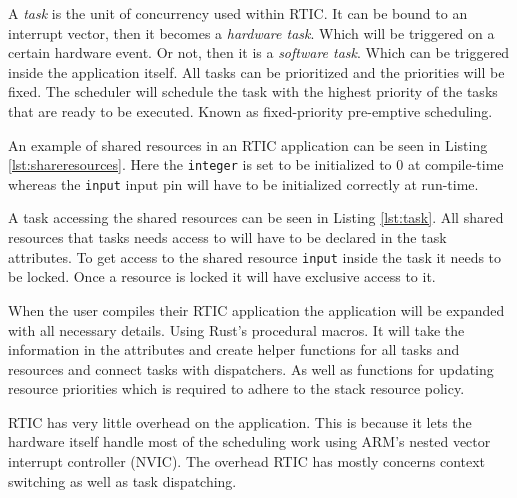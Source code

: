 A \emph{task} is the unit of concurrency used within RTIC. It can be bound to
an interrupt vector, then it becomes a \emph{hardware task}. Which will be
triggered on a certain hardware event. Or not, then it is a \emph{software
task}. Which can be triggered inside the application itself. All tasks can be
prioritized and the priorities will be fixed. The scheduler will schedule
the task with the highest priority of the tasks that are ready to be executed.
Known as fixed-priority pre-emptive scheduling\cite{fixedpriorityhistory}.

An example of shared resources in an RTIC application can be seen in Listing
\ref{lst:shareresources}. Here the \texttt{integer} is set to be initialized to
$0$ at compile-time whereas the \texttt{input} input pin will have to be initialized
correctly at run-time.


A task accessing the shared resources can be seen in Listing \ref{lst:task}.
All shared resources that tasks needs access to will have to be declared in the
task attributes. To get access to the shared resource \texttt{input} inside the
task it needs to be locked. Once a resource is locked it will have exclusive
access to it.


When the user compiles their RTIC application the application will be expanded
with all necessary details. Using Rust's procedural macros. It will take the
information in the attributes and create helper functions for all tasks and
resources and connect tasks with dispatchers. As well as functions for updating
resource priorities which is required to adhere to the stack resource policy.

RTIC has very little overhead on the application. This is because it lets the
hardware itself handle most of the scheduling work using ARM's nested vector
interrupt controller (NVIC).  The overhead RTIC has mostly concerns context switching
as well as task dispatching.

